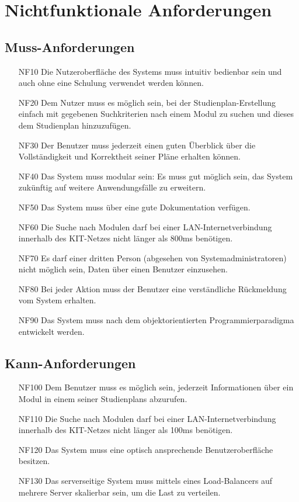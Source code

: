 \section{Nichtfunktionale Anforderungen}
\subsection{Muss-Anforderungen}
\begin{itemize}[nosep]
	\item[NF10]
		Die Nutzeroberfläche des Systems muss intuitiv bedienbar sein und auch ohne eine Schulung verwendet werden können.
	\item[NF20]
		Dem Nutzer muss es möglich sein, bei der \gls{Studienplan}-Erstellung einfach mit gegebenen Suchkriterien nach einem \gls{Modul} zu suchen und dieses dem \gls{Studienplan} hinzuzufügen.
	\item[NF30]
		Der \gls{Benutzer} muss jederzeit einen guten Überblick über die Vollständigkeit und Korrektheit seiner Pläne erhalten können.
	\item[NF40]
		Das System muss modular sein: Es muss gut möglich sein, das System zukünftig auf weitere Anwendungsfälle zu erweitern.
	\item[NF50]
		Das System muss über eine gute Dokumentation verfügen.
	\item[NF60]
		Die Suche nach Modulen darf bei einer LAN-Internetverbindung innerhalb des KIT-Netzes nicht länger als 800ms benötigen.
	\item[NF70]
		Es darf einer dritten Person (abgesehen von Systemadministratoren) nicht möglich sein, Daten über einen \gls{Benutzer} einzusehen.
	\item[NF80]
		Bei jeder Aktion muss der \gls{Benutzer} eine verständliche Rückmeldung vom System erhalten.
	\item[NF90]
		Das System muss nach dem objektorientierten Programmierparadigma entwickelt werden.
\end{itemize}
\subsection{Kann-Anforderungen}
\label{subsec:nonfunc_requirements-kann}
\begin{itemize}[nosep]
	\item[NF100]
		Dem \gls{Benutzer} muss es möglich sein, jederzeit Informationen über ein Modul in einem seiner \glspl{Studienplan} abzurufen.
	\item[NF110]
		Die Suche nach Modulen darf bei einer LAN-Internetverbindung innerhalb des KIT-Netzes nicht länger als 100ms benötigen.
	\item[NF120]
		Das System muss eine optisch ansprechende Benutzeroberfläche besitzen.
	\item[NF130]
		Das serverseitige System muss mittels eines Load-Balancers auf mehrere Server skalierbar sein, um die Last zu verteilen.
\end{itemize}
